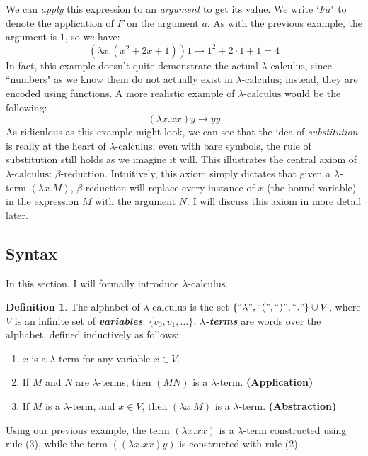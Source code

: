 \documentclass[a4paper,11pt]{article}
\theoremstyle{definition}
\newtheorem{definition}{Definition}[section]
\theoremstyle{example}
\theoremstyle{lemma}
\newcommand{\lcalc}{\lambda\text{-calculus}}
\newcommand{\bred}{\beta\text{-reduction}}
\newcommand{\lamterm}[2]{\lambda #1. #2}
\newcommand{\redto}{\longrightarrow}
\begin{document}
We can \textit{apply} this expression to an \textit{argument} to get its value. We write `$Fa$" to denote the application of $F$ on the argument $a$. As with the previous example, the argument is $1$, so we have:
$$(\lamterm{x}{(x^2 + 2x + 1)})1\redto 1^2 + 2 \cdot 1 + 1 = 4$$
In fact, this example doesn't quite demonstrate the actual $\lcalc$, since ``numbers" as we know them do not actually exist in $\lcalc$; instead, they are encoded using functions. A more realistic example of $\lcalc$ would be the following:
$$(\lamterm{x}{xx})y\redto yy$$
As ridiculous as this example might look, we can see that the idea of \textit{substitution} is really at the heart of $\lcalc$; even with bare symbols, the rule of substitution still holds as we imagine it will. This illustrates the central axiom of $\lcalc$: $\bred$. Intuitively, this axiom simply dictates that given a $\lambda$-term $(\lamterm{x}{M})$, $\bred$ will replace every instance of $x$ (the bound variable) in the expression $M$ with the argument $N$. I will discuss this axiom in more detail later.

\subsection{Syntax}
In this section, I will formally introduce $\lcalc$.

\theoremstyle{definition}
\begin{definition}{}
The alphabet of $\lcalc$ is the set $\{``\lambda", ``(", ``)", ``."\}\cup V$,
where $V$ is an infinite set of \textit{\textbf{variables}}: $\{v_0, v_1, \dots\}$. \textit{\textbf{$\lambda$-terms}} are words over the alphabet, defined inductively as follows:
\begin{enumerate}[topsep=1pt,itemsep=-1ex,partopsep=1ex,parsep=1ex]
    \item $x$ is a $\lambda$-term for any variable $x \in V$.
    \item If $M$ and $N$ are $\lambda$-terms, then $(MN)$ is a $\lambda$-term. \textbf{(Application)}
    \item If $M$ is a $\lambda$-term, and $x \in V$, then $(\lamterm{x}{M})$ is a $\lambda$-term. \textbf{(Abstraction)}
\end{enumerate}
\end{definition}
Using our previous example, the term $(\lamterm{x}{xx})$ is a $\lambda$-term constructed using rule (3), while the term $((\lamterm{x}{xx})y)$ is constructed with rule (2).
\end{document}
